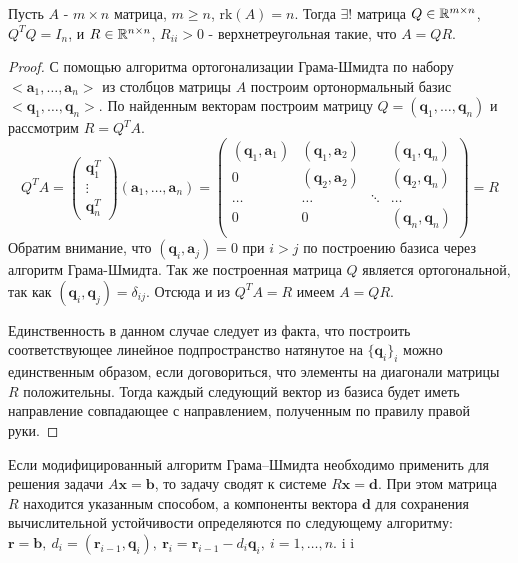 \begin{theorem}
  Пусть $A$ - $m\times n$ матрица, $m\geq n$, $\text{rk}(A)=n$.
  Тогда $\exists!$ матрица $Q\in\mathbb{R}^{m\times n}$, $Q^TQ=I_n$, и $R\in\mathbb{R}^{n\times n}$, $R_{ii}>0$ -
  верхнетреугольная такие, что $A=QR$.
\end{theorem}
\begin{proof}
  С помощью алгоритма ортогонализации Грама-Шмидта по набору $<\mathbf{a}_1,\ldots,\mathbf{a}_n>$
  из столбцов матрицы $A$ построим ортонормальный базис $<\mathbf{q}_1,\ldots,\mathbf{q}_n>$.
  По найденным векторам построим матрицу $Q=(\mathbf{q}_1,\ldots,\mathbf{q}_n)$ и рассмотрим $R=Q^TA$.
  \[Q^TA=
    \left(\begin{array}{c}
        \mathbf{q}_1^T \\
        \vdots         \\
        \mathbf{q}_n^T
      \end{array}\right)
    \left(\mathbf{a}_1,\ldots,\mathbf{a}_n\right)=
    \left(\begin{array}{cccc}
        (\mathbf{q}_1,\mathbf{a}_1) & (\mathbf{q}_1,\mathbf{a}_2) &        & (\mathbf{q}_1,\mathbf{q}_n) \\
        0                           & (\mathbf{q}_2,\mathbf{a}_2) &        & (\mathbf{q}_2,\mathbf{q}_n) \\
        \ldots                      & \ldots                      & \ddots & \ldots                      \\
        0                           & 0                           &        & (\mathbf{q}_n,\mathbf{q}_n) \\
      \end{array}\right)=R\]
  Обратим внимание, что $(\mathbf{q}_i,\mathbf{a}_j)=0$ при $i>j$ по построению
  базиса через алгоритм Грама-Шмидта. Так же построенная матрица $Q$
  является ортогональной, так как $(\mathbf{q}_i,\mathbf{q}_j)=\delta_{ij}$.
  Отсюда и из $Q^TA=R$ имеем $A=QR$.

  Единственность в данном случае следует из факта, что построить
  соответствующее линейное подпространство натянутое на $\{\mathbf{q}_i\}_i$
  можно единственным образом, если договориться, что элементы
  на диагонали матрицы $R$ положительны. Тогда каждый следующий вектор
  из базиса будет иметь направление совпадающее с направлением,
  полученным по правилу правой руки.
\end{proof}

\begin{remark}
  Если модифицированный алгоритм Грама–Шмидта необходимо применить для
  решения задачи $A\mathbf{x} = \mathbf{b}$, то
  задачу сводят к системе $R\mathbf{x}=\mathbf{d}$.
  При этом матрица $R$ находится указанным способом, а компоненты вектора
  $\mathbf{d}$ для сохранения вычислительной устойчивости определяются по
  следующему алгоритму: $\mathbf{r} = \mathbf{b},\ d_i=(\mathbf{r}_{i-1}, \mathbf{q}_i),\ \mathbf{r}_{i}=\mathbf{r}_{i-1}-d_i\mathbf{q}_i,\ i=1,\ldots,n$.     i   i
\end{remark}

